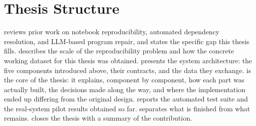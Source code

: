 \section{Thesis Structure}
\label{sec:intro-structure}

 reviews prior work on notebook reproducibility,
automated dependency resolution, and LLM-based program repair, and states
the specific gap this thesis fills.  describes the
scale of the reproducibility problem and how the concrete working dataset for
this thesis was obtained.  presents the system
architecture: the five components introduced above, their contracts, and the
data they exchange.  is the core of the thesis: it
explains, component by component, how each part was actually built, the
decisions made along the way, and where the implementation ended up
differing from the original design.  reports the
automated test suite and the real-system pilot results obtained so far.
 separates what is finished from what remains.
 closes the thesis with a summary of the contribution.
